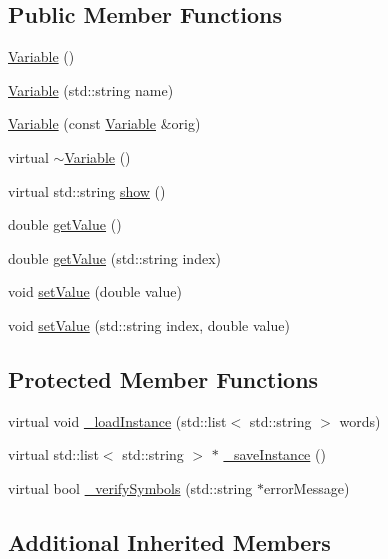\subsection*{Public Member Functions}
\begin{DoxyCompactItemize}
\item 
\hyperlink{class_variable_a5716c9dcafcc8cf59a6f6b5dac3ec7a2}{Variable} ()
\item 
\hyperlink{class_variable_aa577850f5c43638f1042bb4fc1356c25}{Variable} (std\+::string name)
\item 
\hyperlink{class_variable_a1974dd984e1ee5bf74f25d03301108c1}{Variable} (const \hyperlink{class_variable}{Variable} \&orig)
\item 
virtual \hyperlink{class_variable_acfc14d0ad77af53025f890b4d3a7745a}{$\sim$\+Variable} ()
\item 
virtual std\+::string \hyperlink{class_variable_a8bd0a772bb32fd630e252306306cd154}{show} ()
\item 
double \hyperlink{class_variable_a010d43b1092dbc6c3a1c2e0e3e4fc611}{get\+Value} ()
\item 
double \hyperlink{class_variable_a7f127c40dfbac529972ce03daf42a944}{get\+Value} (std\+::string index)
\item 
void \hyperlink{class_variable_a04078db9b38af4589e50ff4c6f468086}{set\+Value} (double value)
\item 
void \hyperlink{class_variable_a8403bc8f6c01702e1f3d6e0031731bca}{set\+Value} (std\+::string index, double value)
\end{DoxyCompactItemize}
\subsection*{Protected Member Functions}
\begin{DoxyCompactItemize}
\item 
virtual void \hyperlink{class_variable_a37db5791f858048daf0549d2ea3f3a62}{\+\_\+load\+Instance} (std\+::list$<$ std\+::string $>$ words)
\item 
virtual std\+::list$<$ std\+::string $>$ $\ast$ \hyperlink{class_variable_a67373d2c7210dd0cab25b4c4df1b5c0e}{\+\_\+save\+Instance} ()
\item 
virtual bool \hyperlink{class_variable_ad29a567d28d673450fb1ecd193bd8d90}{\+\_\+verify\+Symbols} (std\+::string $\ast$error\+Message)
\end{DoxyCompactItemize}
\subsection*{Additional Inherited Members}


